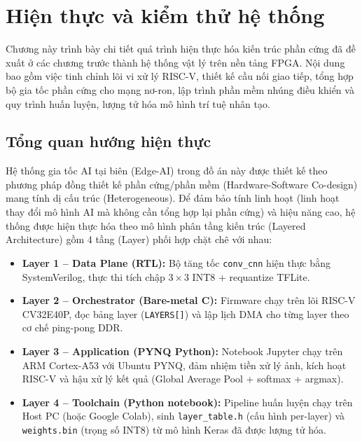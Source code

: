 \chapter{Hiện thực và kiểm thử hệ thống}
\label{chp:05}


Chương này trình bày chi tiết quá trình hiện thực hóa kiến trúc phần cứng đã đề xuất ở các chương trước thành hệ thống vật lý trên nền tảng FPGA. Nội dung bao gồm việc tinh chỉnh lõi vi xử lý RISC-V, thiết kế cầu nối giao tiếp, tổng hợp bộ gia tốc phần cứng cho mạng nơ-ron, lập trình phần mềm nhúng điều khiển và quy trình huấn luyện, lượng tử hóa mô hình trí tuệ nhân tạo.

\section{Tổng quan hướng hiện thực}
Hệ thống gia tốc AI tại biên (Edge-AI) trong đồ án này được thiết kế theo phương pháp đồng thiết kế phần cứng/phần mềm (Hardware-Software Co-design) mang tính dị cấu trúc (Heterogeneous). Để đảm bảo tính linh hoạt (linh hoạt thay đổi mô hình AI mà không cần tổng hợp lại phần cứng) và hiệu năng cao, hệ thống được hiện thực hóa theo mô hình phân tầng kiến trúc (Layered Architecture) gồm 4 tầng (Layer) phối hợp chặt chẽ với nhau:

\begin{itemize}
    \item \textbf{Layer 1 -- Data Plane (RTL):} Bộ tăng tốc \texttt{conv\_cnn} hiện thực bằng SystemVerilog, thực thi tích chập $3 \times 3$ INT8 + requantize TFLite.
    \item \textbf{Layer 2 -- Orchestrator (Bare-metal C):} Firmware chạy trên lõi RISC-V CV32E40P, đọc bảng layer (\texttt{LAYERS[]}) và lập lịch DMA cho từng layer theo cơ chế ping-pong DDR.
    \item \textbf{Layer 3 -- Application (PYNQ Python):} Notebook Jupyter chạy trên ARM Cortex-A53 với Ubuntu PYNQ, đảm nhiệm tiền xử lý ảnh, kích hoạt RISC-V và hậu xử lý kết quả (Global Average Pool + softmax + argmax).
    \item \textbf{Layer 4 -- Toolchain (Python notebook):} Pipeline huấn luyện chạy trên Host PC (hoặc Google Colab), sinh \texttt{layer\_table.h} (cấu hình per-layer) và \texttt{weights.bin} (trọng số INT8) từ mô hình Keras đã được lượng tử hóa.
\end{itemize}


